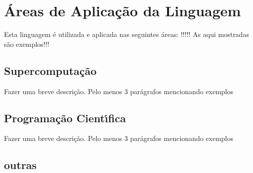    \section{\'{A}reas de Aplica\c{c}\~{a}o da Linguagem}
   Esta linguagem \'{e} utilizada e aplicada nas seguintes \'{a}reas: !!!!! As aqui mostradas s\~{a}o exemplos!!!

        \subsection{ Supercomputa\c{c}\~{a}o}
        Fazer uma breve descri\c{c}\~{a}o. Pelo menos 3 par\'{a}grafos mencionando exemplos

        \subsection{ Programa\c{c}\~{a}o Cient\'{\i}fica}
        Fazer uma breve descri\c{c}\~{a}o. Pelo menos 3 par\'{a}grafos mencionando exemplos

        \subsection{ outras} 